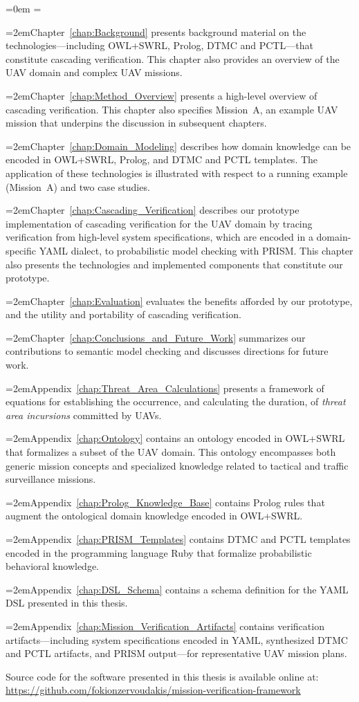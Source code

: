 {
\parindent=0em
\parskip=\medskipamount

\newcommand{\myindent}[1]{\hangindent=2em\textsf{#1}}

\myindent{Chapter~\ref{chap:Background}} presents background material on the technologies---including OWL+SWRL, Prolog, DTMC and PCTL---that constitute cascading verification. This chapter also provides an overview of the UAV domain and complex UAV missions.

\myindent{Chapter~\ref{chap:Method_Overview}} presents a high-level overview of cascading verification. This chapter also specifies Mission~A, an example UAV mission that underpins the discussion in subsequent chapters.

\myindent{Chapter~\ref{chap:Domain_Modeling}} describes how domain knowledge can be encoded in OWL+SWRL, Prolog, and DTMC and PCTL templates. The application of these technologies is illustrated with respect to a running example (Mission~A) and two case studies.

\myindent{Chapter~\ref{chap:Cascading_Verification}} describes our prototype implementation of cascading verification for the UAV domain by tracing verification from high-level system specifications, which are encoded in a domain-specific YAML dialect, to probabilistic model checking with PRISM\@. This chapter also presents the technologies and implemented components that constitute our prototype.

\myindent{Chapter~\ref{chap:Evaluation}} evaluates the benefits afforded by our prototype, and the utility and portability of cascading verification.

\myindent{Chapter~\ref{chap:Conclusions_and_Future_Work}} summarizes our contributions to semantic model checking and discusses directions for future work.

\myindent{Appendix~\ref{chap:Threat_Area_Calculations}} presents a framework of equations for establishing the occurrence, and calculating the duration, of \emph{threat area incursions} committed by UAVs.

\myindent{Appendix~\ref{chap:Ontology}} contains an ontology encoded in OWL+SWRL that formalizes a subset of the UAV domain. This ontology encompasses both generic mission concepts and specialized knowledge related to tactical and traffic surveillance missions.

\myindent{Appendix~\ref{chap:Prolog_Knowledge_Base}} contains Prolog rules that augment the ontological domain knowledge encoded in OWL+SWRL\@.

\myindent{Appendix~\ref{chap:PRISM_Templates}} contains DTMC and PCTL templates encoded in the programming language Ruby that formalize probabilistic behavioral knowledge.

\myindent{Appendix~\ref{chap:DSL_Schema}} contains a schema definition for the YAML DSL presented in this thesis.

\myindent{Appendix~\ref{chap:Mission_Verification_Artifacts}} contains verification artifacts---including system specifications encoded in YAML, synthesized DTMC and PCTL artifacts, and PRISM output---for representative UAV mission plans.

}

\noindent Source code for the software presented in this thesis is available online at: \url{https://github.com/fokionzervoudakis/mission-verification-framework}
